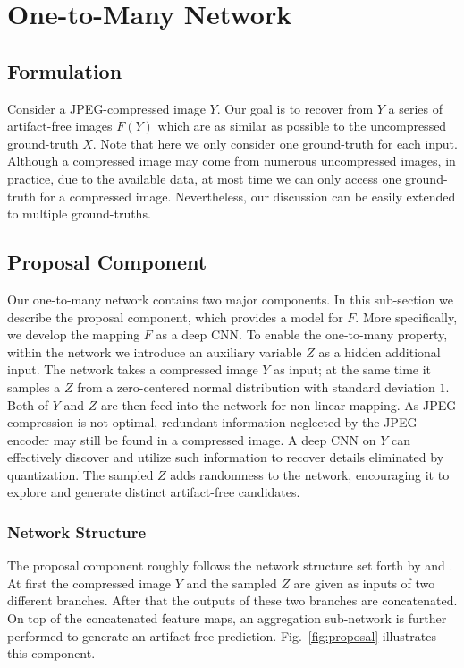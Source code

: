 \documentclass[10pt,twocolumn,letterpaper]{article}
\begin{document}
\section{One-to-Many Network}
\subsection{Formulation}
Consider a JPEG-compressed image $Y$. Our goal is to recover from $Y$ a series of artifact-free images $F(Y)$ which are as similar as possible to the uncompressed ground-truth $X$. Note that here we only consider one ground-truth for each input. Although a compressed image may come from numerous uncompressed images, in practice, due to the available data, at most time we can only access one ground-truth for a compressed image. Nevertheless, our discussion can be easily extended to multiple ground-truths.

\subsection{Proposal Component}
Our one-to-many network contains two major components. In this sub-section we describe the proposal component, which provides a model for $F$. More specifically, we develop the mapping $F$ as a deep CNN. To enable the one-to-many property, within the network we introduce an auxiliary variable $Z$ as a hidden additional input. The network takes a compressed image $Y$ as input; at the same time it samples a $Z$ from a zero-centered normal distribution with standard deviation $1$. Both of $Y$ and $Z$ are then feed into the network for non-linear mapping. As JPEG compression is not optimal, redundant information neglected by the JPEG encoder may still be found in a compressed image. A deep CNN on $Y$ can effectively discover and utilize such information to recover details eliminated by quantization. The sampled $Z$ adds randomness to the network, encouraging it to explore and generate distinct artifact-free candidates.

\subsubsection{Network Structure}
The proposal component roughly follows the network structure set forth by \cite{generative_image_modeling} and \cite{perceptual_losses}. At first the compressed image $Y$ and the sampled $Z$ are given as inputs of two different branches. After that the outputs of these two branches are concatenated. On top of the concatenated feature maps, an aggregation sub-network is further performed to generate an artifact-free prediction. Fig.~\ref{fig:proposal} illustrates this component.
\end{document}
